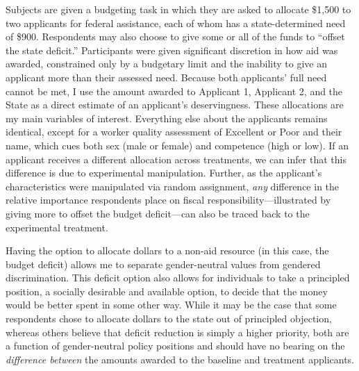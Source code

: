 \documentclass[12pt]{article}%
\begin{document}
\begin{doublespace}
Subjects are given a budgeting task in which they are asked to allocate \$1,500 to two applicants for federal assistance, each of whom has a state-determined need of \$900. Respondents may also choose to give some or all of the funds to ``offset the state deficit.” Participants were given significant discretion in how aid was awarded, constrained only by a budgetary limit and the inability to give an applicant more than their assessed need. Because both applicants’ full need cannot be met, I use the amount awarded to Applicant 1, Applicant 2, and the State as a direct estimate of an applicant’s deservingness. These allocations are my main variables of interest. Everything else about the applicants remains identical, except for a worker quality assessment of Excellent or Poor and their name, which cues both sex (male or female) and competence (high or low). If an applicant receives a different allocation across treatments, we can infer that this difference is due to experimental manipulation. Further, as the applicant’s characteristics were manipulated via random assignment, \textit{any} difference in the relative importance respondents place on fiscal responsibility—illustrated by giving more to offset the budget deficit—can also be traced back to the experimental treatment. 

Having the option to allocate dollars to a non-aid resource (in this case, the budget deficit) allows me to separate gender-neutral values from gendered discrimination. This deficit option also allows for individuals to take a principled position, a socially desirable and available option, to decide that the money would be better spent in some other way. While it may be the case that some respondents chose to allocate dollars to the state out of principled objection, whereas others believe that deficit reduction is simply a higher priority, both are a function of gender-neutral policy positions and should have no bearing on the \textit{difference between} the amounts awarded to the baseline and treatment applicants.


\end{doublespace}
\end{document}
